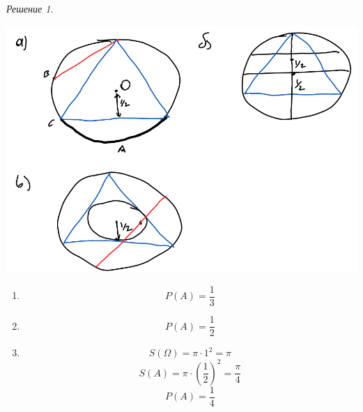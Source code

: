 \documentclass[english]{article}
\theoremstyle{plain}
\theoremstyle{remark}
\newtheorem*{solution}{Решение}
\theoremstyle{definition}
\begin{document}
\begin{solution}
\begin{center}
\includegraphics[width=.9\linewidth]{2_3.png}
\end{center}
\begin{enumerate}
\item \[ P(A) = \frac{1}{3} \]
\item \[ P(A) = \frac{1}{2} \]
\item \[ S(\Omega) = \pi\cdot1^2 = \pi \]
\[ S(A) = \pi \cdot \left(\frac{1}{2}\right)^2 = \frac{\pi}{4} \]
\[ P(A) = \frac{1}{4} \]
\end{enumerate}
\end{solution}
\end{document}
